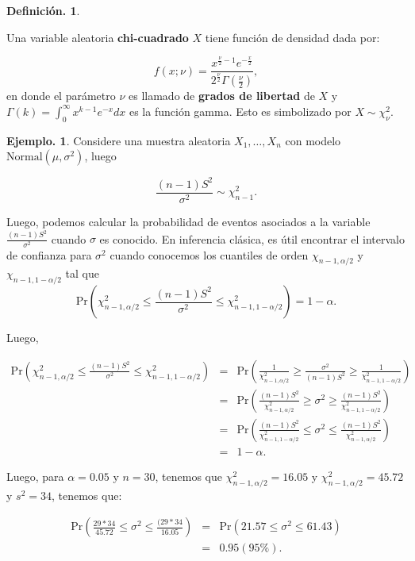 \documentclass[]{book}
\theoremstyle{definition}
\newtheorem{definition}{Definición.}[chapter]
\theoremstyle{definition}
\newtheorem{example}{Ejemplo.}[chapter]
\theoremstyle{definition}
\theoremstyle{remark}
\begin{document}
\begin{definition}
\protect\hypertarget{def:unnamed-chunk-164}{}{\label{def:unnamed-chunk-164} }

Una variable aleatoria \textbf{chi-cuadrado} \(X\) tiene función de
densidad dada por:

\[ f(x ; \nu)=
\frac{x^{\frac{\nu}{2}-1} e^{-\frac{x}{2}}}{2^{\frac{\nu}{2}}
  \Gamma\left(\frac{\nu}{2}\right)},   \]
en donde el parámetro \(\nu\) es llamado de \textbf{grados de libertad} de
\(X\) y \(\Gamma(k)= \int_{0}^{\infty} x^{k-1}e^{-x} dx\) es la función
gamma. Esto es simbolizado por \(X \sim \chi^2_{\nu}\).
\end{definition}

\begin{example}
\protect\hypertarget{exm:unnamed-chunk-165}{}{\label{exm:unnamed-chunk-165} }
Considere una muestra aleatoria \(X_1,\ldots, X_n\) con modelo
\(\mbox{Normal}(\mu,\sigma^2)\), luego

\[\frac{(n-1)S^2}{\sigma^2} \sim \chi^2_{n-1}.\]

Luego, podemos calcular la probabilidad de eventos asociados a la variable
\(\frac{(n-1)S^2}{\sigma^2}\) cuando \(\sigma\) es conocido. En inferencia
clásica, es útil encontrar el intervalo de confianza para \(\sigma^2\) cuando
conocemos los cuantiles de orden \(\chi_{n-1,\alpha/2}\) y
\(\chi_{n-1,1-\alpha/2}\) tal que
\[ \mbox{Pr}\left(  \chi_{n-1,\alpha/2}^2 \leq \frac{(n-1)S^2}{\sigma^2}
\leq  \chi_{n-1,1-\alpha/2}^2 \right) =  1- \alpha.   \]

Luego,

\begin{eqnarray*}
\mbox{Pr}\left(  \chi_{n-1,\alpha/2}^2 \leq \frac{(n-1)S^2}{\sigma^2} \leq 
          \chi_{n-1,1-\alpha/2}^2 \right) &=& 
\mbox{Pr}\left(\frac{1}{ \chi_{n-1,\alpha/2}^2 } \geq 
                \frac{  \sigma^2}{(n-1)S^2}  \geq 
           \frac{1}{ \chi_{n-1,1-\alpha/2}^2 } \right) \\
&=& \mbox{Pr}\left(\frac{(n-1)S^2}{\chi_{n-1,\alpha/2}^2} \geq \sigma^2 
                    \geq 
           \frac{(n-1)S^2}{  \chi_{n-1,1-\alpha/2}^2 } \right)\\
&=& \mbox{Pr}\left(\frac{(n-1)S^2}{ \chi_{n-1,1-\alpha/2}^2} \leq \sigma^2 
                    \leq 
           \frac{(n-1)S^2}{ \chi_{n-1,\alpha/2}^2} \right)\\
&=& 1 - \alpha. 
\end{eqnarray*}

Luego, para \(\alpha= 0.05\) y \(n=30\), tenemos que \(\chi_{n-1,\alpha/2}^2=  16.05\) y \(\chi_{n-1,\alpha/2}^2= 45.72\) y \(s^2=34\), tenemos que:

\begin{eqnarray*}  
\mbox{Pr}\left(\frac{29*34}{ 45.72} \leq \sigma^2 
                    \leq 
             \frac{(29*34}{16.05}\right) 
&=& \mbox{Pr}\left( 21.57 \leq \sigma^2 
                    \leq  61.43 \right) \\
&=& 0.95 (95\%).  
\end{eqnarray*}
\end{example}
\end{document}
